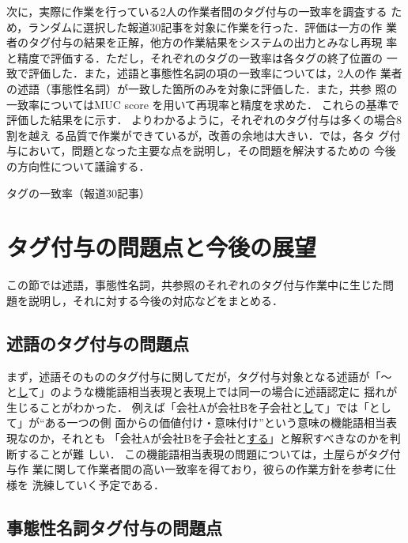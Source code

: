 \documentclass[japanese]{jnlp_1.4}
\def\sec#1{}
\def\tab#1{}
\begin{document}
次に，実際に作業を行っている2人の作業者間のタグ付与の一致率を調査する
ため，ランダムに選択した報道30記事を対象に作業を行った．評価は一方の作
業者のタグ付与の結果を正解，他方の作業結果をシステムの出力とみなし再現
率と精度で評価する．ただし，それぞれのタグの一致率は各タグの終了位置の
一致で評価した．また，述語と事態性名詞の項の一致率については，2人の作
業者の述語（事態性名詞）が一致した箇所のみを対象に評価した．また，共参
照の一致率についてはMUC score \cite{Vilain:95}を用いて再現率と精度を求めた．
これらの基準で評価した結果を\tab{agree}に示す．
\tab{agree}よりわかるように，それぞれのタグ付与は多くの場合8割を越え
る品質で作業ができているが，改善の余地は大きい．\sec{fifth}では，各タ
グ付与において，問題となった主要な点を説明し，その問題を解決するための
今後の方向性について議論する．


\begin{table}[t]
  \caption{タグの一致率（報道30記事）}
  \label{tab:agree}

\end{table}



\section{タグ付与の問題点と今後の展望}
\label{sec:fifth}

この節では述語，事態性名詞，共参照のそれぞれのタグ付与作業中に生じた問
題を説明し，それに対する今後の対応などをまとめる．


\subsection{述語のタグ付与の問題点}

まず，述語そのもののタグ付与に関してだが，タグ付与対象となる述語が「〜
と\ul{し}て」のような機能語相当表現と表現上では同一の場合に述語認定に
揺れが生じることがわかった．
例えば「会社Aが会社Bを子会社と\ul{し}て」では「として」が``ある一つの側
面からの価値付け・意味付け''という意味の機能語相当表現なのか，それとも
「会社Aが会社Bを子会社と\ul{する}」と解釈すべきなのかを判断することが難
しい．
この機能語相当表現の問題については，土屋ら\cite{Tuchiya:06}がタグ付与作
業に関して作業者間の高い一致率を得ており，彼らの作業方針を参考に仕様を
洗練していく予定である．


\subsection{事態性名詞タグ付与の問題点}
\label{ssec:problem_eventnoun}
\end{document}
